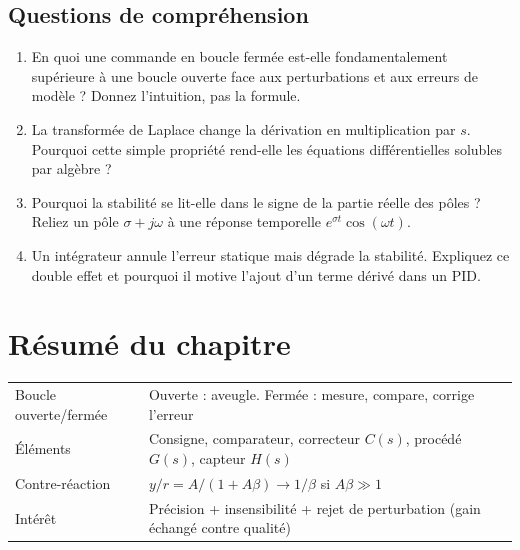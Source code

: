 \documentclass[12pt,a4paper,twoside]{book}
\begin{document}
\subsection*{Questions de compréhension}

\begin{enumerate}[nosep]
\item En quoi une commande en boucle fermée est-elle fondamentalement supérieure à une boucle ouverte face aux perturbations et aux erreurs de modèle ? Donnez l'intuition, pas la formule.
\item La transformée de Laplace change la dérivation en multiplication par $s$. Pourquoi cette simple propriété rend-elle les équations différentielles solubles par algèbre ?
\item Pourquoi la stabilité se lit-elle dans le signe de la partie réelle des pôles ? Reliez un pôle $\sigma + j\omega$ à une réponse temporelle $e^{\sigma t}\cos(\omega t)$.
\item Un intégrateur annule l'erreur statique mais dégrade la stabilité. Expliquez ce double effet et pourquoi il motive l'ajout d'un terme dérivé dans un PID.
\end{enumerate}

\section*{Résumé du chapitre}

\begin{bases}[title={\color{white} Résumé --- Les Bases}]
\begin{center}
\renewcommand{\arraystretch}{1.3}
\begin{tabular}{p{3.5cm}p{9.5cm}}
\toprule
Boucle ouverte/fermée & Ouverte : aveugle. Fermée : mesure, compare, corrige l'erreur \\
Éléments & Consigne, comparateur, correcteur $C(s)$, procédé $G(s)$, capteur $H(s)$ \\
Contre-réaction & $y/r = A/(1+A\beta) \to 1/\beta$ si $A\beta \gg 1$ \\
Intérêt & Précision + insensibilité + rejet de perturbation (gain échangé contre qualité) \\
\bottomrule
\end{tabular}
\end{center}
\end{bases}
\end{document}
